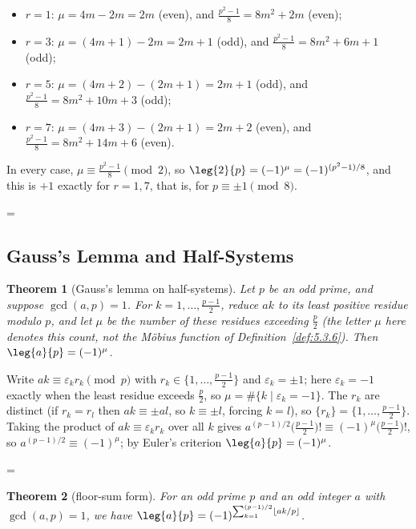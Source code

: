 \documentclass[11pt]{article}
\makeatletter
\theoremstyle{ntstyle}
\newtheorem{theorem}{Theorem}[subsection]
\let\nt@closedisplay\]
\def\nt@guardedclose{\@ifnextchar\par{\nt@closeafterpar}{\@ifnextchar\end{\postdisplaypenalty\@M\nt@closedisplay}{\nt@closedisplay}}}
\def\nt@closeafterpar\par{\@ifnextchar\par{\nt@closeafterpar}{\@ifnextchar\end{\postdisplaypenalty\@M\nt@closedisplay\par}{\nt@closedisplay\par}}}
\renewenvironment{proof}[1][\proofname]{\par
  \pushQED{\qed}\normalfont\topsep\medskipamount\edef\nt@afterproof{\@endparpenalty=\the\@endparpenalty\relax}\@beginparpenalty\@M\@endparpenalty\@M\let\]\nt@guardedclose\trivlist\item[]\textit{#1\@addpunct{.}} \ignorespaces}{\ifvmode\addpenalty\@M\fi\popQED\nt@afterproof\endtrivlist\@endpefalse}
\makeatother
\begin{document}
\begin{proof}
	\begin{itemize}
		\item $r = 1$: $\mu = 4m - 2m = 2m$ (even), and $\tfrac{p^{2}-1}{8} =
			      8m^{2} + 2m$ (even);
		\item $r = 3$: $\mu = (4m+1) - 2m = 2m+1$ (odd), and
		      $\tfrac{p^{2}-1}{8} = 8m^{2} + 6m + 1$ (odd);
		\item $r = 5$: $\mu = (4m+2) - (2m+1) = 2m+1$ (odd), and
		      $\tfrac{p^{2}-1}{8} = 8m^{2} + 10m + 3$ (odd);
		\item $r = 7$: $\mu = (4m+3) - (2m+1) = 2m+2$ (even), and
		      $\tfrac{p^{2}-1}{8} = 8m^{2} + 14m + 6$ (even).
	\end{itemize}

	In every case, $\mu \equiv \tfrac{p^{2}-1}{8} \pmod{2}$, so
	$\leg{2}{p} = (-1)^{\mu} = (-1)^{(p^{2}-1)/8}$, and this is $+1$
	exactly for $r = 1, 7$, that is, for $p \equiv \pm 1 \pmod{8}$.

\end{proof}
\subsection{Gauss's Lemma and Half-Systems}
\begin{theorem}[Gauss's lemma on half-systems]\label{thm:7.3.1} Let $p$ be an odd
	prime, and suppose $\gcd(a, p) = 1$. For $k = 1, \ldots, \tfrac{p-1}{2}$,
	reduce $ak$ to its least positive residue modulo $p$, and let $\mu$
	be the number of these residues exceeding $\tfrac{p}{2}$ (the letter
	$\mu$ here denotes this count, not the M{\"o}bius function of
	Definition~\ref{def:5.3.6}). Then
	$\leg{a}{p} = (-1)^{\mu}$.

\end{theorem}

\begin{proof} Write $ak \equiv \varepsilon_k r_k \pmod{p}$
	with $r_k \in \{1, \ldots, \tfrac{p-1}{2}\}$ and $\varepsilon_k = \pm
		1$; here $\varepsilon_k = -1$ exactly when the least residue exceeds
	$\tfrac{p}{2}$, so $\mu = \#\{k \mid \varepsilon_k = -1\}$. The $r_k$
	are distinct (if $r_k = r_l$ then $ak \equiv \pm al$, so $k \equiv
		\pm l$, forcing $k = l$), so $\{r_k\} = \{1, \ldots,
		\tfrac{p-1}{2}\}$. Taking the product of $ak \equiv \varepsilon_k
		r_k$ over all $k$ gives $a^{(p-1)/2}\big(\tfrac{p-1}{2}\big)! \equiv
		(-1)^{\mu}\big(\tfrac{p-1}{2}\big)!$, so $a^{(p-1)/2} \equiv
		(-1)^{\mu}$; by Euler's criterion $\leg{a}{p} =
		(-1)^{\mu}$.

\end{proof}
\begin{theorem}[floor-sum form]\label{thm:7.3.2} For an odd prime $p$
	and an odd integer $a$ with $\gcd(a, p) = 1$, we have $\leg{a}{p} =
		(-1)^{\sum_{k=1}^{(p-1)/2} \lfloor ak/p \rfloor}$.

\end{theorem}
\end{document}
